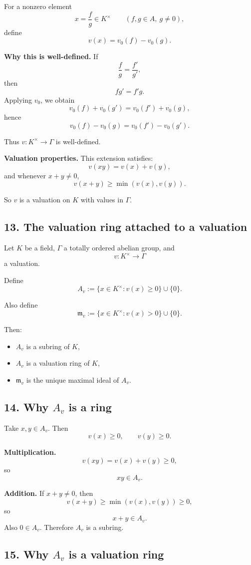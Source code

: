\documentclass[12pt,a4paper]{article}
\theoremstyle{notespace}
\begin{document}
For a nonzero element
\[
x=\frac{f}{g}\in K^\times
\qquad (f,g\in A,\ g\neq 0),
\]
define
\[
v(x)=v_0(f)-v_0(g).
\]

\textbf{Why this is well-defined.}
If
\[
\frac{f}{g}=\frac{f'}{g'},
\]
then
\[
fg'=f'g.
\]
Applying \(v_0\), we obtain
\[
v_0(f)+v_0(g')=v_0(f')+v_0(g),
\]
hence
\[
v_0(f)-v_0(g)=v_0(f')-v_0(g').
\]

Thus \(v:K^\times\to\Gamma\) is well-defined.

\textbf{Valuation properties.}
This extension satisfies:
\[
v(xy)=v(x)+v(y),
\]
and whenever \(x+y\neq 0\),
\[
v(x+y)\ge \min(v(x),v(y)).
\]

So \(v\) is a valuation on \(K\) with values in \(\Gamma\).

\subsection{13. The valuation ring attached to a valuation}

Let \(K\) be a field, \(\Gamma\) a totally ordered abelian group, and
\[
v:K^\times \to \Gamma
\]
a valuation.

Define
\[
A_v := \{x\in K^\times : v(x)\ge 0\}\cup \{0\}.
\]

Also define
\[
\mathfrak m_v := \{x\in K^\times : v(x)>0\}\cup \{0\}.
\]

Then:

\begin{itemize}
	\item \(A_v\) is a subring of \(K\),
	\item \(A_v\) is a valuation ring of \(K\),
	\item \(\mathfrak m_v\) is the unique maximal ideal of \(A_v\).
\end{itemize}

\subsection{14. Why \(A_v\) is a ring}

Take \(x,y\in A_v\). Then
\[
v(x)\ge 0,\qquad v(y)\ge 0.
\]

\textbf{Multiplication.}
\[
v(xy)=v(x)+v(y)\ge 0,
\]
so
\[
xy\in A_v.
\]

\textbf{Addition.}
If \(x+y\neq 0\), then
\[
v(x+y)\ge \min(v(x),v(y))\ge 0,
\]
so
\[
x+y\in A_v.
\]
Also \(0\in A_v\). Therefore \(A_v\) is a subring.

\subsection{15. Why \(A_v\) is a valuation ring}
\end{document}

